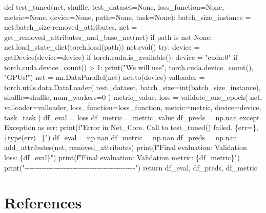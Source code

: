 \documentclass[
  letterpaper,
  DIV=11,
  numbers=noendperiod]{scrreprt}
\newenvironment{Shaded}{\begin{snugshade}}{\end{snugshade}}
\newcommand{\NormalTok}[1]{\textcolor[rgb]{0.00,0.23,0.31}{#1}}
\begin{document}
\begin{Shaded}
\begin{Highlighting}[]
\NormalTok{def test\_tuned(net, shuffle, test\_dataset=None, loss\_function=None,}
\NormalTok{    metric=None, device=None, path=None, task=None):}
\NormalTok{    batch\_size\_instance = net.batch\_size}
\NormalTok{    removed\_attributes, net = get\_removed\_attributes\_and\_base\_net(net)}
\NormalTok{    if path is not None:}
\NormalTok{        net.load\_state\_dict(torch.load(path))}
\NormalTok{        net.eval()}
\NormalTok{    try:}
\NormalTok{        device = getDevice(device=device)}
\NormalTok{        if torch.cuda.is\_available():}
\NormalTok{            device = "cuda:0"}
\NormalTok{            if torch.cuda.device\_count() \textgreater{} 1:}
\NormalTok{                print("We will use", torch.cuda.device\_count(), "GPUs!")}
\NormalTok{                net = nn.DataParallel(net)}
\NormalTok{        net.to(device)}
\NormalTok{        valloader = torch.utils.data.DataLoader(}
\NormalTok{            test\_dataset, batch\_size=int(batch\_size\_instance),}
\NormalTok{            shuffle=shuffle, }
\NormalTok{            num\_workers=0}
\NormalTok{        )}
\NormalTok{        metric\_value, loss = validate\_one\_epoch(}
\NormalTok{            net, valloader=valloader, loss\_function=loss\_function,}
\NormalTok{            metric=metric, device=device, task=task}
\NormalTok{        )}
\NormalTok{        df\_eval = loss}
\NormalTok{        df\_metric = metric\_value}
\NormalTok{        df\_preds = np.nan}
\NormalTok{    except Exception as err:}
\NormalTok{        print(f"Error in Net\_Core. Call to test\_tuned() failed. \{err=\}, }
\NormalTok{            \{type(err)=\}")}
\NormalTok{        df\_eval = np.nan}
\NormalTok{        df\_metric = np.nan}
\NormalTok{        df\_preds = np.nan}
\NormalTok{    add\_attributes(net, removed\_attributes)}
\NormalTok{    print(f"Final evaluation: Validation loss: \{df\_eval\}")}
\NormalTok{    print(f"Final evaluation: Validation metric: \{df\_metric\}")}
\NormalTok{    print("{-}{-}{-}{-}{-}{-}{-}{-}{-}{-}{-}{-}{-}{-}{-}{-}{-}{-}{-}{-}{-}{-}{-}{-}{-}{-}{-}{-}{-}{-}{-}{-}{-}{-}{-}{-}{-}{-}{-}{-}{-}{-}{-}{-}{-}{-}")}
\NormalTok{    return df\_eval, df\_preds, df\_metric}
\end{Highlighting}
\end{Shaded}

\chapter*{References}\label{references}
\end{document}
